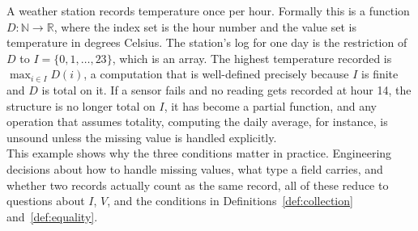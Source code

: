 A weather station records temperature once per hour. Formally this is a
function $D : \mathbb{N} \to \mathbb{R}$, where the index set is the hour
number and the value set is temperature in degrees Celsius. The station's log
for one day is the restriction of $D$ to $I = \{0, 1, \dots, 23\}$, which is
an array. The highest temperature recorded is $\max_{i \in I} D(i)$, a
computation that is well-defined precisely because $I$ is finite and $D$ is
total on it. If a sensor fails and no reading gets recorded at hour 14, the
structure is no longer total on $I$, it has become a partial function, and any
operation that assumes totality, computing the daily average, for instance, is
unsound unless the missing value is handled explicitly.\\
This example shows why the three conditions matter in practice. Engineering
decisions about how to handle missing values, what type a field carries, and
whether two records actually count as the same record, all of these reduce to
questions about $I$, $V$, and the conditions in Definitions~\ref{def:collection}
and~\ref{def:equality}.

